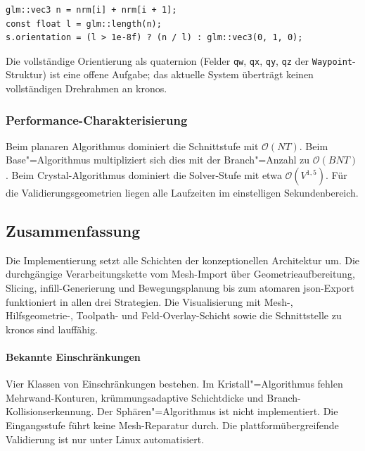                     \begin{lstlisting}[style=cppStyle, caption={Berechnung der Werkzeugausrichtung}, label={lst:impl-crystal-tool-frame}]
glm::vec3 n = nrm[i] + nrm[i + 1];
const float l = glm::length(n);
s.orientation = (l > 1e-8f) ? (n / l) : glm::vec3(0, 1, 0);
                    \end{lstlisting}

                    Die vollständige Orientierung als \gls{quaternion} (Felder \texttt{qw}, \texttt{qx}, \texttt{qy},
                    \texttt{qz} der \texttt{Waypoint}-Struktur) ist eine offene Aufgabe; das aktuelle System
                    überträgt keinen vollständigen Drehrahmen an \ac{kronos}.

            \subsubsection{Performance-Charakterisierung}\label{subsubsec:impl-slicing-performance}
                Beim planaren Algorithmus dominiert die Schnittstufe mit $\mathcal{O}(NT)$.
                Beim Base"=Algorithmus multipliziert sich dies mit der Branch"=Anzahl zu $\mathcal{O}(BNT)$.
                Beim Crystal-Algorithmus dominiert die Solver-Stufe mit etwa $\mathcal{O}(V^{1{,}5})$.
                Für die Validierungsgeometrien liegen alle Laufzeiten im einstelligen Sekundenbereich.

        \subsection{Zusammenfassung}\label{subsec:impl-medusa-summary}
            Die Implementierung setzt alle Schichten der konzeptionellen Architektur um.
            Die durchgängige Verarbeitungskette vom Mesh-Import über Geometrieaufbereitung, Slicing, \gls{infill}-Generierung und Bewegungsplanung bis zum atomaren \gls{json}-Export funktioniert in allen drei Strategien.
            Die Visualisierung mit Mesh-, Hilfsgeometrie-, Toolpath- und Feld-Overlay-Schicht sowie die Schnittstelle zu \ac{kronos} sind lauffähig.

            \paragraph{Bekannte Einschränkungen}\label{para:impl-medusa-summary-limitations}
                Vier Klassen von Einschränkungen bestehen.
                Im Kristall"=Algorithmus fehlen Mehrwand-Konturen, krümmungsadaptive Schichtdicke und Branch-Kollisionserkennung.
                Der Sphären"=Algorithmus ist nicht implementiert.
                Die Eingangsstufe führt keine Mesh-Reparatur durch.
                Die plattformübergreifende Validierung ist nur unter Linux automatisiert.

